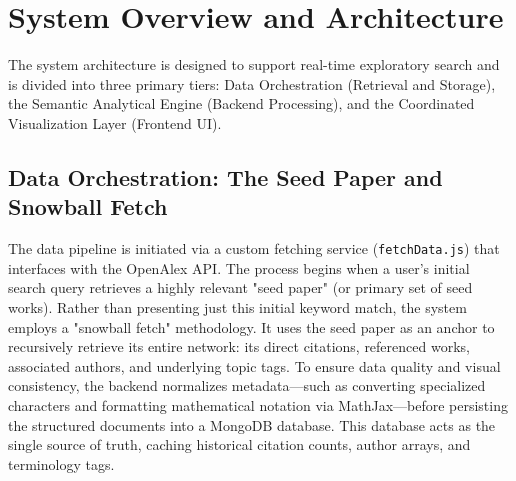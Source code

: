 \documentclass[sigconf]{acmart}
\begin{document}
\section{System Overview and Architecture}

The system architecture is designed to support real-time exploratory search and is divided into three primary tiers: Data Orchestration (Retrieval and Storage), the Semantic Analytical Engine (Backend Processing), and the Coordinated Visualization Layer (Frontend UI).

\subsection{Data Orchestration: The Seed Paper and Snowball Fetch}
The data pipeline is initiated via a custom fetching service (\texttt{fetchDa\allowbreak ta.js}) that interfaces with the OpenAlex API. The process begins when a user's initial search query retrieves a highly relevant "seed paper" (or primary set of seed works). Rather than presenting just this initial keyword match, the system employs a "snowball fetch" methodology. It uses the seed paper as an anchor to recursively retrieve its entire network: its direct citations, referenced works, associated authors, and underlying topic tags. To ensure data quality and visual consistency, the backend normalizes metadata—such as converting specialized characters and formatting mathematical notation via MathJax—before persisting the structured documents into a MongoDB database. This database acts as the single source of truth, caching historical citation counts, author arrays, and terminology tags.
\end{document}
